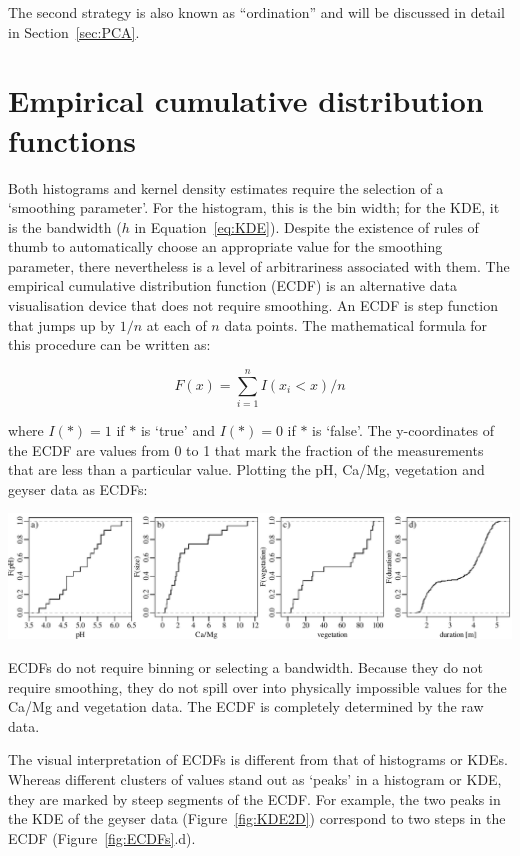 The second strategy is also known as ``ordination'' and will be
discussed in detail in Section~\ref{sec:PCA}.

\section{Empirical cumulative distribution functions}
\label{sec:ECDF}

Both histograms and kernel density estimates require the selection of
a `smoothing parameter'. For the histogram, this is the bin width; for
the KDE, it is the bandwidth ($h$ in Equation~\ref{eq:KDE}). Despite
the existence of rules of thumb to automatically choose an appropriate
value for the smoothing parameter, there nevertheless is a level of
arbitrariness associated with them. The empirical cumulative
distribution function (ECDF) is an alternative data visualisation
device that does not require smoothing. An ECDF is step function that
jumps up by $1/n$ at each of $n$ data points.  The mathematical
formula for this procedure can be written as:
  
  \begin{equation}
    F(x) = \sum\limits_{i=1}^{n} I(x_i<x)/n
    \label{eq:ECDF}
  \end{equation}
 
\noindent where $I(\ast) = 1$ if $\ast$ is `true' and $I(\ast) = 0$ if
$\ast$ is `false'. The y-coordinates of the ECDF are values from 0 to
1 that mark the fraction of the measurements that are less than a
particular value.  Plotting the pH, Ca/Mg, vegetation and geyser data
as ECDFs:

\noindent\includegraphics[width=\textwidth]{../figures/ECDFs.pdf}
\begingroup {}
\label{fig:ECDFs}
\endgroup

ECDFs do not require binning or selecting a bandwidth.  Because they
do not require smoothing, they do not spill over into physically
impossible values for the Ca/Mg and vegetation data. The ECDF is
completely determined by the raw data.\medskip

The visual interpretation of ECDFs is different from that of
histograms or KDEs. Whereas different clusters of values stand out as
`peaks' in a histogram or KDE, they are marked by steep segments of
the ECDF. For example, the two peaks in the KDE of the geyser data
(Figure~\ref{fig:KDE2D}) correspond to two steps in the ECDF
(Figure~\ref{fig:ECDFs}.d).
